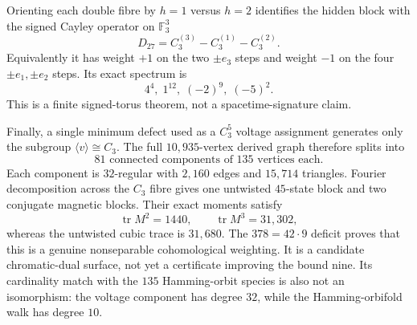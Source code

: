 Orienting each double fibre by $h=1$ versus $h=2$ identifies the hidden block with the signed Cayley operator on $\mathbb F_3^3$
\[
  \boxed{D_{27}=C_3^{(3)}-C_3^{(1)}-C_3^{(2)}}.
\]
Equivalently it has weight $+1$ on the two $\pm e_3$ steps and weight $-1$ on the four $\pm e_1,\pm e_2$ steps.  Its exact spectrum is
\[
  4^4,\;1^{12},\;(-2)^9,\;(-5)^2.
\]
This is a finite signed-torus theorem, not a spacetime-signature claim.

Finally, a single minimum defect used as a $C_3^5$ voltage assignment generates only the subgroup $\langle v\rangle\cong C_3$.  The full $10{,}935$-vertex derived graph therefore splits into
\[
  \boxed{81\text{ connected components of }135\text{ vertices each}}.
\]
Each component is $32$-regular with $2{,}160$ edges and $15{,}714$ triangles.  Fourier decomposition across the $C_3$ fibre gives one untwisted $45$-state block and two conjugate magnetic blocks.  Their exact moments satisfy
\[
 \operatorname{tr}M^2=1440,\qquad \operatorname{tr}M^3=31{,}302,
\]
whereas the untwisted cubic trace is $31{,}680$.  The $378=42\cdot9$ deficit proves that this is a genuine nonseparable cohomological weighting.  It is a candidate chromatic-dual surface, not yet a certificate improving the bound nine.  Its cardinality match with the $135$ Hamming-orbit species is also not an isomorphism: the voltage component has degree $32$, while the Hamming-orbifold walk has degree $10$.
